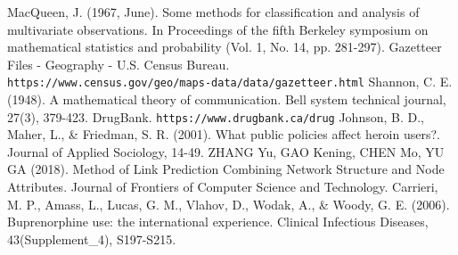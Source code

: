 \documentclass[12pt]{article}
\begin{document}
\begin{thebibliography}{99}

MacQueen, J. (1967, June). Some methods for classification and analysis of multivariate observations. In Proceedings of the fifth Berkeley symposium on mathematical statistics and probability (Vol. 1, No. 14, pp. 281-297).
Gazetteer Files - Geography - U.S. Census Bureau. \texttt{\\https://www.census.gov/geo/maps-data/data/gazetteer.html}
Shannon, C. E. (1948). A mathematical theory of communication. Bell system technical journal, 27(3), 379-423.
DrugBank. \texttt{https://www.drugbank.ca/drug}
Johnson, B. D., Maher, L., \& Friedman, S. R. (2001). What public policies affect heroin users?. Journal of Applied Sociology, 14-49.
ZHANG Yu, GAO Kening, CHEN Mo, YU GA (2018). Method of Link Prediction Combining Network Structure and Node Attributes. Journal of Frontiers of Computer Science and Technology.
Carrieri, M. P., Amass, L., Lucas, G. M., Vlahov, D., Wodak, A., \& Woody, G. E. (2006). Buprenorphine use: the international experience. Clinical Infectious Diseases, 43(Supplement\_4), S197-S215.

\end{thebibliography}
\end{document}
